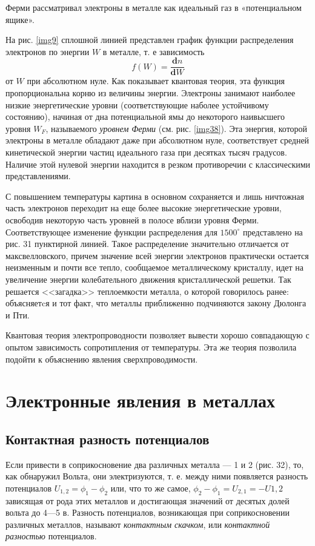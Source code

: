 \documentclass[a4paper,10pt]{book}
\begin{document}
Ферми рассматривал электроны в металле как идеальный газ в «потенциальном ящике». 

На рис. \ref{img9} сплошной линией представлен график функции распределения электронов по энергии $W$ в металле, т. е зависимость 
\begin{equation*}
 f(W) = \frac{\mathbf{d}n}{\mathbf{d}W}
\end{equation*}
от $W$ при абсолютном нуле. Как показывает квантовая теория, эта функция пропорциональна корню из величины энергии. Электроны занимают наиболее низкие энергетические уровни (соответствующие наболее устойчивому состоянию), начиная от дна потенциальной ямы до некоторого наивысшего уровня $W_F$, называемого \emph{уровнем Ферми} (см. рис. \ref{img38}). Эта энергия, которой электроны в металле обладают даже при абсолютном нуле, соответствует средней кинетической энергии частиц идеального газа при десятках тысяч градусов. Наличие этой нулевой энергии находится в резком противоречии с классическими представлениями. %

С повышением температуры картина в основном сохраняется и лишь ничтожная часть электронов переходит на еще более высокие энергетические уровни, освободив некоторую часть уровней в полосе вблизи уровня Ферми. Соответствующее изменение функции распределения для $1500^\circ$ представлено на рис. 31 пунктирной линией. Такое распределение значительно отличается от максвелловского, причем значение всей энергии электронов практически остается неизменным и почти все тепло, сообщаемое металлическому кристаллу, идет на увеличение энергии колебательного движения кристаллической решетки. Так решается <<загадка>> теплоемкости металла, о которой говорилось ранее: объясняетcя и тот факт, что металлы приближенно подчиняются закону Дюлонга и Пти. 

Квантовая теория электропроводности позволяет вывести хорошо совпадающую с опытом зависимость сопротипления от температуры. Эта же теория позволила подойти к объяснению явления сверхпроводимости.

\chapter{Электронные явления в металлах} 
\section{Контактная разность потенциалов} 
Если привести в соприкосновение два различных металла — 1 и 2 (рис. 32), то, как обнаружил Вольта, они электризуются, т. е. между ними появляется разность потенциалов $U_{1,2} = \phi_1 - \phi_2$ или, что то же самое, $\phi_2 - \phi_1 = U_{2,1} = -U{1,2}$ зависящая от рода этих металлов и достигающая значений от десятых долей вольта до 4—5 в. Разность потенциалов, возникающая при соприкосновении различных металлов, называют \emph{контактным скачком}, или \emph{контактной разностью} потенциалов. 
\end{document}
